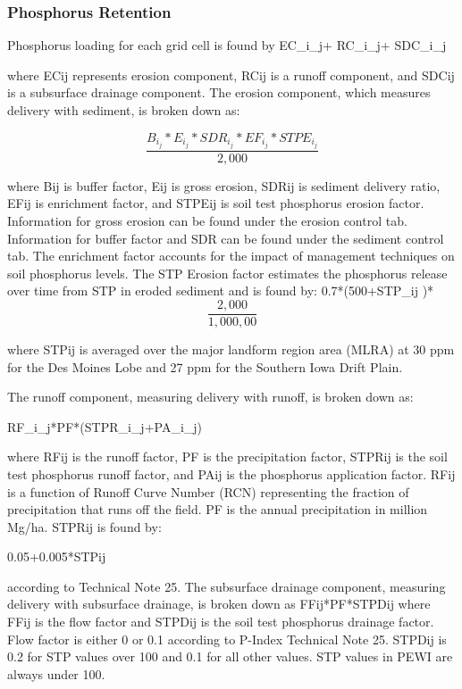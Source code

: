 \documentclass[11pt]{article}
\begin{document}
\subsubsection{Phosphorus Retention}
Phosphorus loading for each grid cell is found by 
EC_i_j+ RC_i_j+ SDC_i_j

where ECij represents erosion component, RCij is a runoff component, and SDCij is a subsurface drainage component. The erosion component, which measures delivery with sediment, is broken down as: 

\[\frac{B_i_j*E_i_j* SDR_i_j* EF_i_j * STPE_i_j}{2,000}\]

where Bij is buffer factor, Eij is gross erosion, SDRij is sediment delivery ratio, EFij is enrichment factor\cite{55}, and STPEij is soil test phosphorus erosion factor.  Information for gross erosion can be found under the erosion control tab. Information for buffer factor and SDR can be found under the sediment control tab. The enrichment factor accounts for the impact of management techniques on soil phosphorus levels.\cite{56}  The STP Erosion factor estimates the phosphorus release over time from STP in eroded sediment\cite{57} and is found by:
 0.7*(500+STP_ij )* \[\frac{2,000}{1,000,00}\]

where STPij is averaged over the major landform region area (MLRA) at 30 ppm for the Des Moines Lobe and 27 ppm for the Southern Iowa Drift Plain.\cite{58}

The runoff component, measuring delivery with runoff, is broken down as:


RF_i_j*PF*(STPR_i_j+PA_i_j)

where RFij is the runoff factor, PF is the precipitation factor, STPRij is the soil test phosphorus runoff factor, and PAij is the phosphorus application factor. RFij is a function of Runoff Curve Number (RCN) representing the fraction of precipitation that runs off the field.\cite{59}  PF is the annual precipitation in million Mg/ha. 
STPRij is found by:
  
 0.05+0.005*STPij 
 
according to Technical Note 25.\cite{60}
The subsurface drainage component, measuring delivery with subsurface drainage, is broken down as 
FFij*PF*STPDij
where FFij is the flow factor and STPDij is the soil test phosphorus drainage factor. Flow factor is either 0 or 0.1 according to P-Index Technical Note 25.\cite{61}  STPDij is 0.2 for STP values over 100 and 0.1 for all other values.\cite{62} STP values in PEWI are always under 100.
\end{document}
